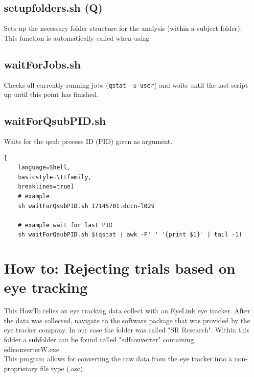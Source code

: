 \documentclass[12pt,a4paper]{scrartcl}
\begin{document}
\subsection{setupfolders.sh (Q)}
\label{sh:setDir}
Sets up the necessary folder structure for the analysis (within a subject folder). This function is automatically called when using \texttt{}\\

\subsection{waitForJobs.sh}
\label{sh:wait}
Checks all currently running jobs (\texttt{qstat -u user}) and waits until the last script up until this point has finished.\\

\subsection{waitForQsubPID.sh}
\label{sh:wait}
Waits for the qsub process ID (PID) given as argument.\\

\begin{lstlisting}[
    language=Shell,
    basicstyle=\ttfamily,
    breaklines=true]
    # example
    sh waitForQsubPID.sh 17145701.dccn-l029

    # example wait for last PID
    sh waitForQsubPID.sh $(qstat | awk -F' ' '{print $1}' | tail -1)
\end{lstlisting}

\section{How to: Rejecting trials based on eye tracking}
\label{sec:eye}
This HowTo relies on eye tracking data collect with an EyeLink eye tracker. After the data was collected, navigate to the software package that was provided by the eye tracker company. In our case the folder was called "SR Research". Within this folder a subfolder can be found called "edfconverter" containing edfconverterW.exe\\

\noindent This program allows for converting the raw data from the eye tracker into a non-proprietary file type (.asc).\\
\end{document}
